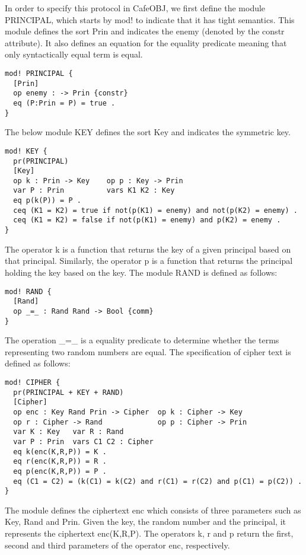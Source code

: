 \documentclass[a4paper,fleqn]{cas-dc}
\begin{document}
In order to specify this protocol in CafeOBJ, we first define the module PRINCIPAL, which starts by mod! to indicate that it has tight semantics. This module defines the sort Prin and indicates the enemy (denoted by the constr attribute). It also defines an equation for the equality predicate meaning that only syntactically equal term is equal.
\begin{small}
\begin{verbatim}
mod! PRINCIPAL {
  [Prin]
  op enemy : -> Prin {constr}
  eq (P:Prin = P) = true .
}
\end{verbatim}
\end{small}
The below module KEY defines the sort Key and indicates the symmetric key.
\begin{small}
\begin{verbatim}
mod! KEY {
  pr(PRINCIPAL)
  [Key]
  op k : Prin -> Key    op p : Key -> Prin
  var P : Prin          vars K1 K2 : Key
  eq p(k(P)) = P .
  ceq (K1 = K2) = true if not(p(K1) = enemy) and not(p(K2) = enemy) .
  ceq (K1 = K2) = false if not(p(K1) = enemy) and p(K2) = enemy .
}
\end{verbatim}
\end{small}
The operator k is a function that returns the key of a given principal based on that principal. Similarly, the operator p is a function that returns the principal holding the key based on the key.
The module RAND is defined as follows:
\begin{small}
\begin{verbatim}
mod! RAND {
  [Rand]
  op _=_ : Rand Rand -> Bool {comm}
}
\end{verbatim}
\end{small}
The operation \_=\_ is a equality predicate to determine whether the terms representing two random numbers are equal.
The specification of cipher text is defined as follows:
\begin{small}
\begin{verbatim}
mod! CIPHER {
  pr(PRINCIPAL + KEY + RAND)
  [Cipher]
  op enc : Key Rand Prin -> Cipher  op k : Cipher -> Key
  op r : Cipher -> Rand             op p : Cipher -> Prin
  var K : Key   var R : Rand
  var P : Prin  vars C1 C2 : Cipher
  eq k(enc(K,R,P)) = K .
  eq r(enc(K,R,P)) = R .
  eq p(enc(K,R,P)) = P .
  eq (C1 = C2) = (k(C1) = k(C2) and r(C1) = r(C2) and p(C1) = p(C2)) .
}
\end{verbatim}
\end{small}
The module defines the ciphertext enc which consists of three parameters such as Key, Rand and Prin. Given the key, the random number and the principal, it represents the ciphertext enc(K,R,P). The operators k, r and p return the first, second and third parameters of the operator enc, respectively.
\end{document}
